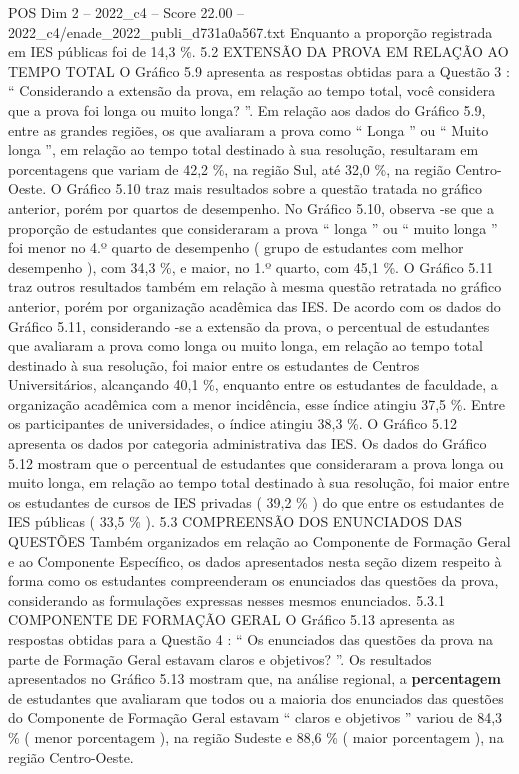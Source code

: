 \begin{textsample}{POS Dim 2 – 2022\_c4 – Score 22.00 – 2022\_c4/enade\_2022\_publi\_d731a0a567.txt}
Enquanto a proporção registrada em IES públicas foi de 14,3 \%. 5.2 EXTENSÃO DA PROVA EM RELAÇÃO AO TEMPO TOTAL O Gráfico 5.9 apresenta as respostas obtidas para a Questão 3 : “ Considerando a extensão da prova, em relação ao tempo total, você considera que a prova foi longa ou muito longa? ”.
Em relação aos dados do Gráfico 5.9, entre as grandes regiões, os que avaliaram a prova como “ Longa ” ou “ Muito longa ”, em relação ao tempo total destinado à sua resolução, resultaram em porcentagens que variam de 42,2 \%, na região Sul, até 32,0 \%, na região Centro-Oeste.
O Gráfico 5.10 traz mais resultados sobre a questão tratada no gráfico anterior, porém por quartos de desempenho.
No Gráfico 5.10, observa -se que a proporção de estudantes que consideraram a prova “ longa ” ou “ muito longa ” foi menor no 4.º quarto de desempenho ( grupo de estudantes com melhor desempenho ), com 34,3 \%, e maior, no 1.º quarto, com 45,1 \%.
O Gráfico 5.11 traz outros resultados também em relação à mesma questão retratada no gráfico anterior, porém por organização acadêmica das IES.
De acordo com os dados do Gráfico 5.11, considerando -se a extensão da prova, o percentual de estudantes que avaliaram a prova como longa ou muito longa, em relação ao tempo total destinado à sua resolução, foi maior entre os estudantes de Centros Universitários, alcançando 40,1 \%, enquanto entre os estudantes de faculdade, a organização acadêmica com a menor incidência, esse índice atingiu 37,5 \%.
Entre os participantes de universidades, o índice atingiu 38,3 \%.
O Gráfico 5.12 apresenta os dados por categoria administrativa das IES.
Os dados do Gráfico 5.12 mostram que o percentual de estudantes que consideraram a prova longa ou muito longa, em relação ao tempo total destinado à sua resolução, foi maior entre os estudantes de cursos de IES privadas ( 39,2 \% ) do que entre os estudantes de IES públicas ( 33,5 \% ). 5.3 COMPREENSÃO DOS ENUNCIADOS DAS QUESTÕES Também organizados em relação ao Componente de Formação Geral e ao Componente Específico, os dados apresentados nesta seção dizem respeito à forma como os estudantes compreenderam os enunciados das questões da prova, considerando as formulações expressas nesses mesmos enunciados. 5.3.1 COMPONENTE DE FORMAÇÃO GERAL O Gráfico 5.13 apresenta as respostas obtidas para a Questão 4 : “ Os enunciados das questões da prova na parte de Formação Geral estavam claros e objetivos? ”.
Os resultados apresentados no Gráfico 5.13 mostram que, na análise regional, a \textbf{percentagem} de estudantes que avaliaram que todos ou a maioria dos enunciados das questões do Componente de Formação Geral estavam “ claros e objetivos ” variou de 84,3 \% ( menor porcentagem ), na região Sudeste e 88,6 \% ( maior porcentagem ), na região Centro-Oeste.

\end{textsample}
